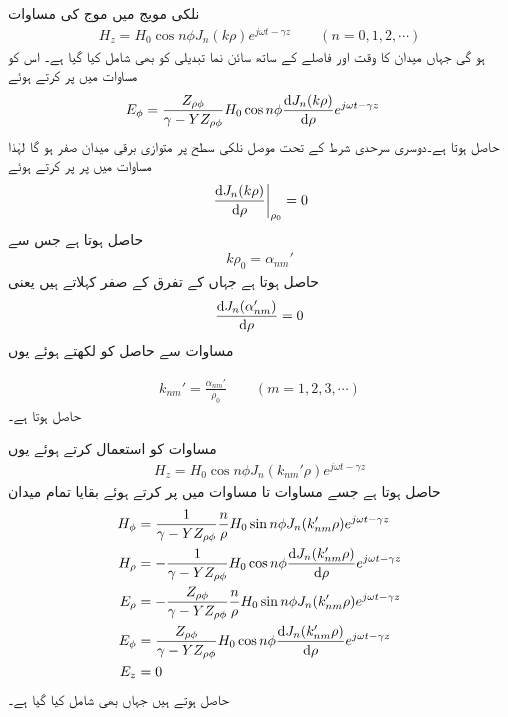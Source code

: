 نلکی مویج میں موج کی مساوات
\begin{align}\label{مساوات_مویج_نلکی_حل_پ}
H_z=H_0  \cos n \phi  J_n(k \rho) e^{j\omega t -\gamma z}  \quad \quad (n=0,1,2,\cdots)
\end{align}
ہو گی جہاں میدان کا وقت اور فاصلے کے ساتھ سائن نما تبدیلی کو بھی شامل کیا گیا ہے۔ اس کو مساوات  میں پر کرتے ہوئے 
\begin{align}
E_{\phi}&=\frac{Z_{\rho \phi}}{\gamma-YZ_{\rho \phi}}H_0  \cos n \phi  \frac{\dif J_n(k \rho)}{\dif \rho} e^{j\omega t -\gamma z}\label{مساوات_مویج_حل_تقریباً_مکمل}
\end{align}
حاصل ہوتا ہے۔دوسری سرحدی  شرط کے تحت موصل نلکی سطح پر متوازی برقی میدان صفر ہو گا لہٰذا  مساوات  میں  پر  پر کرتے ہوئے
\begin{align}
 \left. \frac{\dif J_n(k \rho)}{\dif \rho}\right|_{\rho_0}=0
\end{align}
حاصل ہوتا ہے جس سے
\begin{align}\label{مساوات_مویج_مستقل_بمطابق_شرط_الف}
k \rho_0=\alpha_{nm}'
\end{align}
حاصل ہوتا ہے جہاں   کے تفرق کے صفر  کہلاتے ہیں یعنی
\begin{align}
 \frac{\dif  J_n(\alpha_{nm}')}{\dif \rho}=0
\end{align}
مساوات  سے حاصل  کو  لکھتے ہوئے یوں


\begin{align}\label{مساوات_مویج_مستقل_بمطابق_شرط}
k_{nm}'=\frac{\alpha_{nm}'}{\rho_0} \quad \quad (m=1,2,3,\cdots)
\end{align}
حاصل ہوتا ہے۔ 

مساوات  کو استعمال کرتے ہوئے یوں
 \begin{align}\label{مساوات_مویج_نلکی_حل_ت}
H_z=H_0  \cos n \phi  J_n(k_{nm}'\rho) e^{j\omega t -\gamma z} 
\end{align} 
حاصل ہوتا ہے جسے  مساوات  تا مساوات  میں پر کرتے ہوئے بقایا تمام میدان
\begin{align}
H_{\phi}&=\frac{1}{\gamma-YZ_{\rho \phi}} \frac{n}{\rho} H_0 \sin n\phi J_n(k_{nm}'\rho)e^{j\omega t-\gamma z}  \\
H_{\rho}&=-\frac{1}{\gamma-YZ_{\rho \phi}}H_0  \cos n \phi \frac{\dif  J_n(k_{nm}' \rho)}{\dif \rho} e^{j\omega t -\gamma z} \\
E_{\rho}&=-\frac{Z_{\rho \phi}}{\gamma-YZ_{\rho \phi}} \frac{n}{\rho}H_0  \sin n \phi  J_n(k_{nm}' \rho) e^{j\omega t -\gamma z}\\
E_{\phi}&=\frac{Z_{\rho \phi}}{\gamma-YZ_{\rho \phi}}H_0  \cos n \phi  \frac{\dif J_n(k_{nm}' \rho)}{\dif \rho} e^{j\omega t -\gamma z}\\
E_z&=0
\end{align}
حاصل ہوتے ہیں جہاں  بھی شامل کیا گیا ہے۔


